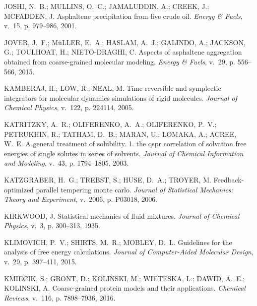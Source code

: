 \documentclass[
	12pt,				%
	openany,			%
	oneside,			%
	a4paper,			%
	english,			%
	brazil				%
	]{abntex2}
\begin{document}
\begin{thebibliography}{}
{JOSHI, N.~B.; MULLINS, O.~C.; JAMALUDDIN, A.; CREEK, J.; MCFADDEN, J.
  Asphaltene precipitation from live crude oil.
\emph{Energy \& Fuels}, v.~15, p. 979--986, 2001.}

{JOVER, J.~F.; MüLLER, E.~A.; HASLAM, A.~J.; GALINDO, A.; JACKSON, G.;
  TOULHOAT, H.; NIETO-DRAGHI, C. Aspects of asphaltene aggregation obtained
  from coarse-grained molecular modeling.
\emph{Energy \& Fuels}, v.~29, p. 556--566, 2015.}

{KAMBERAJ, H.; LOW, R.; NEAL, M. Time reversible and symplectic integrators for
  molecular dynamics simulations of rigid molecules.
\emph{Journal of Chemical Physics}, v.~122, p. 224114, 2005.}

{KATRITZKY, A.~R.; OLIFERENKO, A.~A.; OLIFERENKO, P.~V.; PETRUKHIN, R.; TATHAM,
  D.~B.; MARAN, U.; LOMAKA, A.; ACREE, W.~E. A general treatment of solubility.
  1. the qspr correlation of solvation free energies of single solutes in
  series of solvents.
\emph{Journal of Chemical Information and Modeling}, v.~43, p. 1794--1805,
  2003.}

{KATZGRABER, H.~G.; TREBST, S.; HUSE, D.~A.; TROYER, M. Feedback-optimized
  parallel tempering monte carlo.
\emph{Journal of Statistical Mechanics: Theory and Experiment}, v.~2006, p.
  P03018, 2006.}

{KIRKWOOD, J. Statistical mechanics of fluid mixtures.
\emph{Journal of Chemical Physics}, v.~3, p. 300–313, 1935.}

{KLIMOVICH, P.~V.; SHIRTS, M.~R.; MOBLEY, D.~L. Guidelines for the analysis of
  free energy calculations.
\emph{Journal of Computer-Aided Molecular Design}, v.~29, p. 397--411, 2015.}

{KMIECIK, S.; GRONT, D.; KOLINSKI, M.; WIETESKA, L.; DAWID, A.~E.; KOLINSKI, A.
  Coarse-grained protein models and their applications.
\emph{Chemical Reviews}, v.~116, p. 7898–7936, 2016.}


\end{thebibliography}
\end{document}
